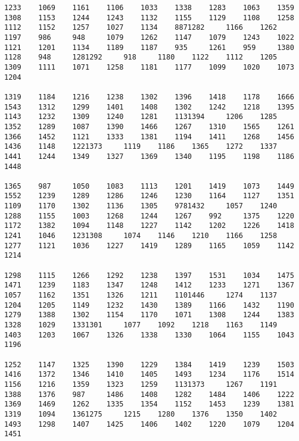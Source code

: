 \begin{verbatim}
1233    1069    1161    1106    1033    1338    1283    1063    1359    1308    1153    1244    1243    1132    1155    1129    1108    1258    1112    1152    1257    1027    1134    8871282     1166    1262    1197    986     948     1079    1262    1147    1079    1243    1022    1121    1201    1134    1189    1187    935     1261    959     1380    1128    948     1281292     918     1180    1122    1112    1205    1309    1111    1071    1258    1181    1177    1099    1020    1073    1204

1319    1184    1216    1238    1302    1396    1418    1178    1666    1543    1312    1299    1401    1408    1302    1242    1218    1395    1143    1232    1309    1240    1281    1131394     1206    1285    1352    1289    1087    1390    1466    1267    1310    1565    1261    1366    1452    1121    1333    1381    1194    1411    1268    1456    1436    1148    1221373     1119    1186    1365    1272    1337    1441    1244    1349    1327    1369    1340    1195    1198    1186    1448

1365    987     1050    1083    1113    1201    1419    1073    1449    1552    1239    1289    1286    1246    1230    1164    1127    1351    1109    1170    1302    1136    1305    9781432     1057    1240    1288    1155    1003    1268    1244    1267    992     1375    1220    1172    1382    1094    1148    1227    1142    1202    1226    1418    1241    1046    1231308     1074    1146    1210    1166    1258    1277    1121    1036    1227    1419    1289    1165    1059    1142    1214

1298    1115    1266    1292    1238    1397    1531    1034    1475    1471    1239    1183    1347    1248    1412    1233    1271    1367    1057    1162    1351    1326    1211    1101446     1274    1137    1204    1205    1149    1232    1430    1389    1166    1432    1190    1279    1388    1302    1154    1170    1071    1308    1244    1383    1328    1029    1331301     1077    1092    1218    1163    1149    1403    1203    1067    1326    1338    1330    1064    1155    1043    1196

1252    1147    1325    1390    1229    1384    1419    1239    1503    1416    1372    1346    1410    1405    1493    1234    1176    1514    1156    1216    1359    1323    1259    1131373     1267    1191    1388    1376    987     1486    1408    1282    1484    1406    1222    1369    1469    1262    1335    1354    1152    1453    1239    1381    1319    1094    1361275     1215    1280    1376    1350    1402    1493    1298    1407    1425    1406    1402    1220    1079    1204    1451


\end{verbatim}
